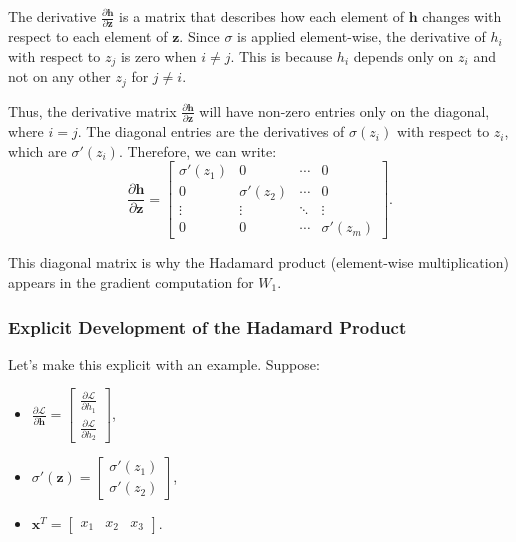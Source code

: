 \begin{notechapter}
The derivative \( \frac{\partial \mathbf{h}}{\partial \mathbf{z}} \) is a matrix that describes how each element of \( \mathbf{h} \) changes with respect to each element of \( \mathbf{z} \). Since \( \sigma \) is applied element-wise, the derivative of \( h_i \) with respect to \( z_j \) is zero when \( i \neq j \). This is because \( h_i \) depends only on \( z_i \) and not on any other \( z_j \) for \( j \neq i \).

Thus, the derivative matrix \( \frac{\partial \mathbf{h}}{\partial \mathbf{z}} \) will have non-zero entries only on the diagonal, where \( i = j \). The diagonal entries are the derivatives of \( \sigma(z_i) \) with respect to \( z_i \), which are \( \sigma'(z_i) \). Therefore, we can write:
\[
\frac{\partial \mathbf{h}}{\partial \mathbf{z}} = \begin{bmatrix}
\sigma'(z_1) & 0 & \cdots & 0 \\
0 & \sigma'(z_2) & \cdots & 0 \\
\vdots & \vdots & \ddots & \vdots \\
0 & 0 & \cdots & \sigma'(z_m)
\end{bmatrix}.
\]

This diagonal matrix is why the Hadamard product (element-wise multiplication) appears in the gradient computation for \( W_1 \).

\subsubsection{Explicit Development of the Hadamard Product}
Let’s make this explicit with an example. Suppose:
\begin{itemize}
    \item \( \frac{\partial \mathcal{L}}{\partial \mathbf{h}} = \begin{bmatrix} \frac{\partial \mathcal{L}}{\partial h_1} \\ \frac{\partial \mathcal{L}}{\partial h_2} \end{bmatrix} \),
    \item \( \sigma'(\mathbf{z}) = \begin{bmatrix} \sigma'(z_1) \\ \sigma'(z_2) \end{bmatrix} \),
    \item \( \mathbf{x}^T = \begin{bmatrix} x_1 & x_2 & x_3 \end{bmatrix} \).
\end{itemize}


\end{notechapter}
